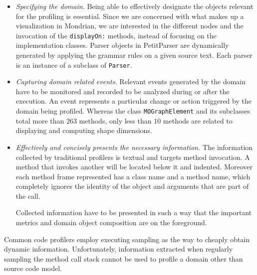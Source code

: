 \documentclass[runningheads]{llncs}
\newcommand{\ct}{\lstinline[backgroundcolor=\color{white},basicstyle=\footnotesize\ttfamily]}
\newcommand{\lr}[1]{\nb{Lukas}{orange}{#1}}
\begin{document}
\begin{itemize}
\item \emph{Specifying the domain.} Being able to effectively designate the objects relevant for the profiling is essential.
Since we are concerned with what makes up a visualization in Mondrian, we are interested in the different nodes and the invocation of the \ct{displayOn:} methods, instead of focusing on the implementation classes. 
Parser objects in PetitParser are dynamically generated by applying the grammar rules on a given source text. Each parser is an instance of a subclass of \ct{Parser}. 

\item \emph{Capturing domain related events.}
Relevant events generated by the domain have to be monitored and recorded to be analyzed during or after the execution. An event represents a particular change or action triggered by the domain being profiled. 
Whereas the class \ct{MOGraphElement} and its subclasses total more than 263 methods, only less than 10 methods are related to displaying and computing shape dimensions. 

 
\item \emph{Effectively and concisely presents the necessary information.} 
The information collected by traditional profilers is textual and targets method invocation. A method that invokes another will be located below it and indented. Moreover each method frame represented has a class name and a method name, which completely ignores the identity of the object and arguments that are part of the call.

Collected information have to be presented in such a way that the important metrics and domain object composition are on the foreground.  

\end{itemize}


Common code profilers employ executing sampling as the way to cheaply obtain dynamic information. Unfortunately, information extracted when regularly sampling the method call stack cannot be used to profile a domain other than source code model.
\end{document}
